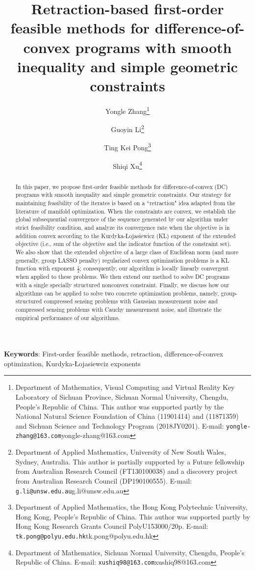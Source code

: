 \documentclass[10pt]{article}
\title{\sf Retraction-based first-order feasible methods for difference-of-convex programs with smooth inequality and simple geometric constraints}
\author{
Yongle Zhang\thanks{
        Department of Mathematics, Visual Computing and Virtual Reality Key Laboratory of Sichuan Province, Sichuan Normal University, Chengdu, People's Republic of China.
        This author was supported partly by the National Natural Science Foundation of China (11901414) and (11871359) and Sichuan Science and Technology Program (2018JY0201).
        E-mail: \texttt{yongle-zhang@163.com}{yongle-zhang@163.com}}
\and
Guoyin Li\thanks{
        Department of Applied Mathematics, University of New South Wales, Sydney, Australia.
        This author is partially supported by a Future fellowship from Australian Research Council (FT130100038) and a discovery project from Australian Research Council (DP190100555).
        E-mail: \texttt{g.li@unsw.edu.au}{g.li@unsw.edu.au}}
\and
Ting Kei Pong\thanks{
		Department of Applied Mathematics, the Hong Kong Polytechnic University, Hong Kong, People's Republic of China.
		This author was supported partly by Hong Kong Research Grants Council PolyU153000/20p.
		E-mail: \texttt{tk.pong@polyu.edu.hk}{tk.pong@polyu.edu.hk}}
\and
Shiqi Xu\thanks{
        Department of Mathematics, Sichuan Normal University, Chengdu, People's Republic of China.
        E-mail: \texttt{xushiq98@163.com}{xushiq98@163.com}}
}
\numberwithin{equation}{section}
\begin{document}
\maketitle

\begin{abstract}
  In this paper, we propose first-order feasible methods for difference-of-convex (DC) programs with smooth inequality and simple geometric constraints. Our strategy for maintaining feasibility of the iterates is based on a ``retraction" idea adapted from the literature of manifold optimization. When the constraints are convex, we establish the global subsequential convergence of the sequence generated by our algorithm under strict feasibility condition, and analyze its convergence rate when the objective is in addition convex according to the Kurdyka-{\L}ojasiewicz (KL) exponent of the extended objective (i.e., sum of the objective and the indicator function of the constraint set). We also show that the extended objective of a large class of Euclidean norm (and more generally, group LASSO penalty) regularized convex optimization problems is a KL function with exponent $\frac12$; consequently, our algorithm is locally linearly convergent when applied to these problems. We then extend our method to solve DC programs with a single specially structured nonconvex constraint. Finally, we discuss how our algorithms can be applied to solve two concrete optimization problems, namely, group-structured compressed sensing problems with Gaussian measurement noise and compressed sensing problems with Cauchy measurement noise, and illustrate the empirical performance of our algorithms.
\end{abstract}

{\small
{\bf Keywords}: First-order feasible methods, retraction, difference-of-convex optimization, Kurdyka-{\L}ojasiewciz exponents
}
\end{document}
